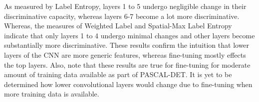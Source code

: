 As measured by Label Entropy, layers 1 to 5 undergo negligible change in their discriminative capacity, whereas layers 6-7 become a lot more discriminative. Whereas, the measures of Weighted Label and Spatial-Max Label Entropy indicate that only layers 1 to 4 undergo minimal changes and other layers become substantially more discriminative. These results confirm the intuition that lower layers of the CNN are more generic features, whereas fine-tuning mostly effects the top layers. Also, note that these results are true for fine-tuning for moderate amount of training data available as part of PASCAL-DET. It is yet to be determined how lower convolutional layers would change due to fine-tuning when more training data is available. 
